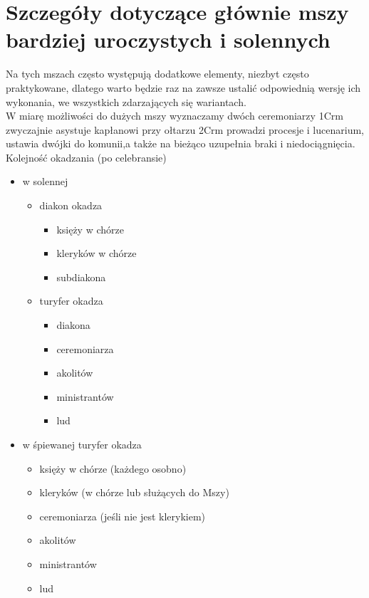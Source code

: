 \section{Szczegóły dotyczące głównie mszy bardziej uroczystych i solennych}

		Na tych mszach często występują dodatkowe elementy, niezbyt często praktykowane, dlatego warto będzie raz na zawsze ustalić odpowiednią wersję ich wykonania, we wszystkich zdarzających się wariantach.\\
		
		\noindent W miarę możliwości do dużych mszy wyznaczamy dwóch ceremoniarzy 1Crm zwyczajnie asystuje kapłanowi przy ołtarzu 2Crm prowadzi procesje i lucenarium, ustawia dwójki do komunii,a także na bieżąco uzupełnia braki i niedociągnięcia.\\
		
		Kolejność okadzania (po celebransie)
		\begin{itemize}
			\item w solennej 
				\begin{itemize}
					\item diakon okadza 
						\begin{itemize}
							\item księży w chórze
							\item kleryków w chórze
							\item subdiakona
						\end{itemize}
					\item turyfer okadza
						\begin{itemize}
							\item diakona
							\item ceremoniarza
							\item akolitów
							\item ministrantów
							\item lud
						\end{itemize}
				\end{itemize}
			\item w śpiewanej turyfer okadza
				\begin{itemize}
					\item księży w chórze (każdego osobno)
					\item kleryków (w chórze lub służących do Mszy)
					\item ceremoniarza (jeśli nie jest klerykiem)
					\item akolitów
					\item ministrantów
					\item lud
				\end{itemize}
		\end{itemize}
		
		